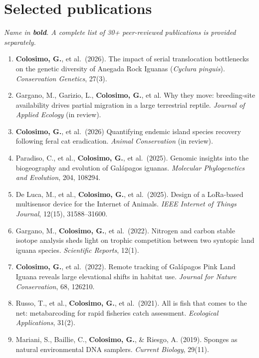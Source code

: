 \documentclass[11pt]{article}
\begin{document}
\section*{Selected publications}
\noindent\emph{Name in \textbf{bold}. A complete list of 30+ peer-reviewed publications is provided separately.}
\begin{enumerate}[leftmargin=1.6em,itemsep=3pt]
\item \textbf{Colosimo, G.}, et al.\ (2026). The impact of serial translocation bottlenecks on the genetic diversity of Anegada Rock Iguanas (\emph{Cyclura pinguis}). \emph{Conservation Genetics}, 27(3).
\item Gargano, M., Garizio, L., \textbf{Colosimo, G.}, et al. Why they move: breeding-site availability drives partial migration in a large terrestrial reptile. \emph{Journal of Applied Ecology} (in review).
\item \textbf{Colosimo, G.}, et al.\ (2026) Quantifying endemic island species recovery following feral cat eradication. \emph{Animal Conservation} (in review).
\item Paradiso, C., et al., \textbf{Colosimo, G.}, et al.\ (2025). Genomic insights into the biogeography and evolution of Gal\'apagos iguanas. \emph{Molecular Phylogenetics and Evolution}, 204, 108294.
\item De Luca, M., et al., \textbf{Colosimo, G.}, et al.\ (2025). Design of a LoRa-based multisensor device for the Internet of Animals. \emph{IEEE Internet of Things Journal}, 12(15), 31588--31600.
\item Gargano, M., \textbf{Colosimo, G.}, et al.\ (2022). Nitrogen and carbon stable isotope analysis sheds light on trophic competition between two syntopic land iguana species. \emph{Scientific Reports}, 12(1).
\item \textbf{Colosimo, G.}, et al.\ (2022). Remote tracking of Gal\'apagos Pink Land Iguana reveals large elevational shifts in habitat use. \emph{Journal for Nature Conservation}, 68, 126210.
\item Russo, T., et al., \textbf{Colosimo, G.}, et al.\ (2021). All is fish that comes to the net: metabarcoding for rapid fisheries catch assessment. \emph{Ecological Applications}, 31(2).
\item Mariani, S., Baillie, C., \textbf{Colosimo, G.}, \& Riesgo, A. (2019). Sponges as natural environmental DNA samplers. \emph{Current Biology}, 29(11).
\end{enumerate}
\end{document}
